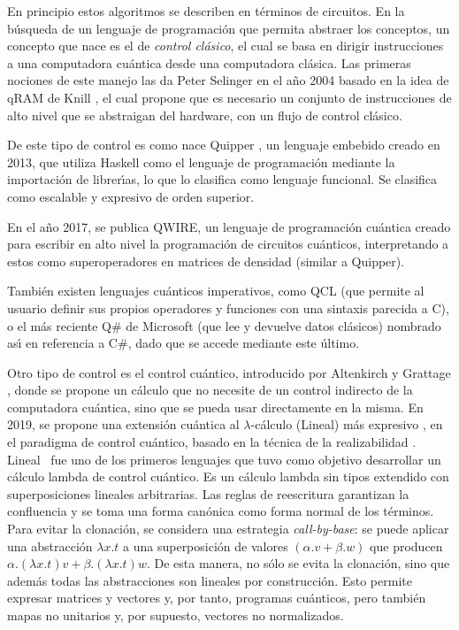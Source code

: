 En principio estos algoritmos se describen en t\'erminos de circuitos.
En la b\'usqueda de un lenguaje de programaci\'on que permita abstraer los conceptos,
un concepto que nace es el de \emph{control cl\'asico}, el cual se basa
en dirigir instrucciones a una computadora cu\'antica desde una computadora cl\'asica. Las primeras nociones de
este manejo las da Peter Selinger en el a\~no 2004 \parencite{Selinger2004} basado en la idea de qRAM de Knill \parencite{Knill1996},
el cual propone que es necesario un conjunto de instrucciones de alto nivel que se abstraigan del hardware,
con un flujo de control cl\'asico.

De este tipo de control es como nace Quipper \parencite{GreenEtAl2013}, un lenguaje
embebido creado en 2013, que utiliza Haskell como el lenguaje de programaci\'on mediante
la importaci\'on de librer\'{\i}as, lo que lo clasifica como lenguaje funcional. Se clasifica como
escalable y expresivo de orden superior.

En el a\~no 2017, se publica QWIRE, un lenguaje de programaci\'on cu\'antica creado para escribir en alto nivel la
programaci\'on de circuitos cu\'anticos, interpretando a estos como superoperadores en matrices de densidad \parencite{PaykinRandZdancewic2017} (similar a Quipper).

Tambi\'en existen lenguajes cu\'anticos imperativos, como QCL (que permite al usuario definir sus propios
operadores y funciones con una sintaxis parecida a C), o el m\'as reciente Q\# de Microsoft (que lee y
devuelve datos cl\'asicos) nombrado as\'{\i} en referencia a C\#, dado que se accede mediante este \'ultimo.

Otro tipo de control es el control cu\'antico, introducido por Altenkirch y Grattage
\parencite{AltenkirchGrattage2005},
donde se propone un c\'alculo que no necesite de un control indirecto de la computadora cu\'antica, sino que se
pueda usar directamente en la misma. En 2019, se propone una extensi\'on cu\'antica al \(\lambda\)-c\'alculo (Lineal)
m\'as expresivo \parencite{DiazcaroEtAl2019}, en el paradigma de control cu\'antico, basado en la t\'ecnica de la realizabilidad \parencite{Kleene1945}. Lineal~\parencite{ArrighiDowek2017} fue uno de los primeros lenguajes que tuvo como objetivo desarrollar un c\'alculo lambda de control cu\'antico. Es un c\'alculo lambda sin tipos extendido con superposiciones lineales arbitrarias. Las reglas de reescritura garantizan la confluencia y se toma una forma can\'onica como forma normal de los t\'erminos. Para evitar la clonaci\'on, se considera una estrategia {\em call-by-base}: se puede aplicar una abstracci\'on \(\lambda x.t\) a una superposici\'on de valores \((\alpha.v+\beta.w)\) que producen \(\alpha. (\lambda x.t)v+\beta.(\lambda x.t)w\). De esta manera, no s\'olo se evita la clonaci\'on, sino que adem\'as todas las abstracciones son lineales por construcci\'on. Esto permite expresar matrices y vectores y, por tanto, programas cu\'anticos, pero tambi\'en mapas no unitarios y, por supuesto, vectores no normalizados.

